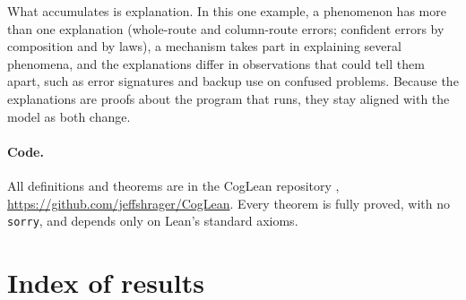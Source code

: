 \documentclass[11pt]{article}
\newcommand{\code}[1]{\texttt{#1}}
\begin{document}
What accumulates is explanation. In this one example, a phenomenon has more than one explanation (whole-route and column-route errors; confident errors by composition and by laws), a mechanism takes part in explaining several phenomena, and the explanations differ in observations that could tell them apart, such as error signatures and backup use on confused problems. Because the explanations are proofs about the program that runs, they stay aligned with the model as both change.

\paragraph{Code.} All definitions and theorems are in the CogLean repository \citep{coglean}, \url{https://github.com/jeffshrager/CogLean}. Every theorem is fully proved, with no \code{sorry}, and depends only on Lean's standard axioms.




\appendix
\section{Index of results}
\label{app:index}
\end{document}
